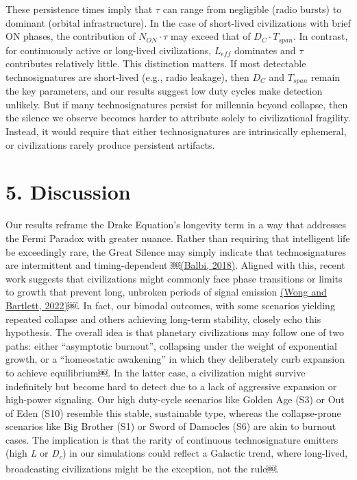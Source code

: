 These persistence times imply that \(\tau\) can range from negligible (radio bursts) to dominant (orbital infrastructure). In the case of short-lived civilizations with brief ON phases, the contribution of \(N_{ON} \cdot \tau\) may exceed that of \(D_{C} \cdot T_{span}\). In contrast, for continuously active or long-lived civilizations, \(L_{eff}\) dominates and \(\tau\) contributes relatively little. This distinction matters. If most detectable technosignatures are short-lived (e.g., radio leakage), then \(D_{C}\) and \(T_{span}\) remain the key parameters, and our results suggest low duty cycles make detection unlikely. But if many technosignatures persist for millennia beyond collapse, then the silence we observe becomes harder to attribute solely to civilizational fragility. Instead, it would require that either technosignatures are intrinsically ephemeral, or civilizations rarely produce persistent artifacts.

\section{5. Discussion}\label{discussion}

Our results reframe the Drake Equation's longevity term in a way that addresses the Fermi Paradox with greater nuance. Rather than requiring that intelligent life be exceedingly rare, the Great Silence may simply indicate that technosignatures are intermittent and timing-dependent ￼\href{https://paperpile.com/c/hQuIW4/X9R2}{(Balbi, 2018)}. Aligned with this, recent work suggests that civilizations might commonly face phase transitions or limits to growth that prevent long, unbroken periods of signal emission \href{https://paperpile.com/c/hQuIW4/S0Br}{(Wong and Bartlett, 2022)}￼. In fact, our bimodal outcomes, with some scenarios yielding repeated collapse and others achieving long-term stability, closely echo this hypothesis. The overall idea is that planetary civilizations may follow one of two paths: either ``asymptotic burnout'', collapsing under the weight of exponential growth, or a ``homeostatic awakening'' in which they deliberately curb expansion to achieve equilibrium￼. In the latter case, a civilization might survive indefinitely but become hard to detect due to a lack of aggressive expansion or high-power signaling. Our high duty-cycle scenarios like Golden Age (S3) or Out of Eden (S10) resemble this stable, sustainable type, whereas the collapse-prone scenarios like Big Brother (S1) or Sword of Damocles (S6) are akin to burnout cases. The implication is that the rarity of continuous technosignature emitters (high \emph{L} or \emph{D\textsubscript{c}}) in our simulations could reflect a Galactic trend, where long-lived, broadcasting civilizations might be the exception, not the rule￼.

